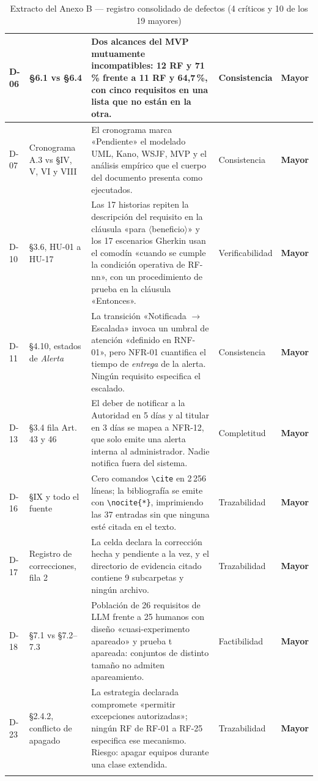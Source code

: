 \documentclass[11pt,letterpaper]{article}
\begin{document}
\begin{longtable}{|p{0.9cm}|p{3.4cm}|p{7.6cm}|p{1.6cm}|p{1.3cm}|}
D-06 & \S6.1 vs \S6.4 & Dos alcances del MVP mutuamente incompatibles: 12 RF y 71\,\% frente a 11 RF y 64,7\,\%, con cinco requisitos en una lista que no están en la otra. & Consistencia & \textcolor{ambar}{\textbf{Mayor}} \\ \hline
D-07 & Cronograma A.3 vs \S IV, V, VI y VIII & El cronograma marca «Pendiente» el modelado UML, Kano, WSJF, MVP y el análisis empírico que el cuerpo del documento presenta como ejecutados. & Consistencia & \textcolor{ambar}{\textbf{Mayor}} \\ \hline
D-10 & \S3.6, HU-01 a HU-17 & Las 17 historias repiten la descripción del requisito en la cláusula «para \(\langle\)beneficio\(\rangle\)» y los 17 escenarios Gherkin usan el comodín «cuando se cumple la condición operativa de RF-nn», con un procedimiento de prueba en la cláusula «Entonces». & Verificabilidad & \textcolor{ambar}{\textbf{Mayor}} \\ \hline
D-11 & \S4.10, estados de \emph{Alerta} & La transición «Notificada $\rightarrow$ Escalada» invoca un umbral de atención «definido en RNF-01», pero NFR-01 cuantifica el tiempo de \emph{entrega} de la alerta. Ningún requisito especifica el escalado. & Consistencia & \textcolor{ambar}{\textbf{Mayor}} \\ \hline
D-13 & \S3.4 fila Art.\,43 y 46 & El deber de notificar a la Autoridad en 5 días y al titular en 3 días se mapea a NFR-12, que solo emite una alerta interna al administrador. Nadie notifica fuera del sistema. & Completitud & \textcolor{ambar}{\textbf{Mayor}} \\ \hline
D-16 & \S IX y todo el fuente & Cero comandos \texttt{\textbackslash cite} en 2\,256 líneas; la bibliografía se emite con \texttt{\textbackslash nocite\{*\}}, imprimiendo las 37 entradas sin que ninguna esté citada en el texto. & Trazabilidad & \textcolor{ambar}{\textbf{Mayor}} \\ \hline
D-17 & Registro de correcciones, fila 2 & La celda declara la corrección hecha y pendiente a la vez, y el directorio de evidencia citado contiene 9 subcarpetas y ningún archivo. & Trazabilidad & \textcolor{ambar}{\textbf{Mayor}} \\ \hline
D-18 & \S7.1 vs \S7.2--7.3 & Población de 26 requisitos de LLM frente a 25 humanos con diseño «cuasi-experimento apareado» y prueba t apareada: conjuntos de distinto tamaño no admiten apareamiento. & Factibilidad & \textcolor{ambar}{\textbf{Mayor}} \\ \hline
D-23 & \S2.4.2, conflicto de apagado & La estrategia declarada compromete «permitir excepciones autorizadas»; ningún RF de RF-01 a RF-25 especifica ese mecanismo. Riesgo: apagar equipos durante una clase extendida. & Trazabilidad & \textcolor{ambar}{\textbf{Mayor}} \\ \hline
\caption{Extracto del Anexo B --- registro consolidado de defectos (4 críticos y 10 de los 19 mayores)}
\end{longtable}
\normalsize
\end{document}
